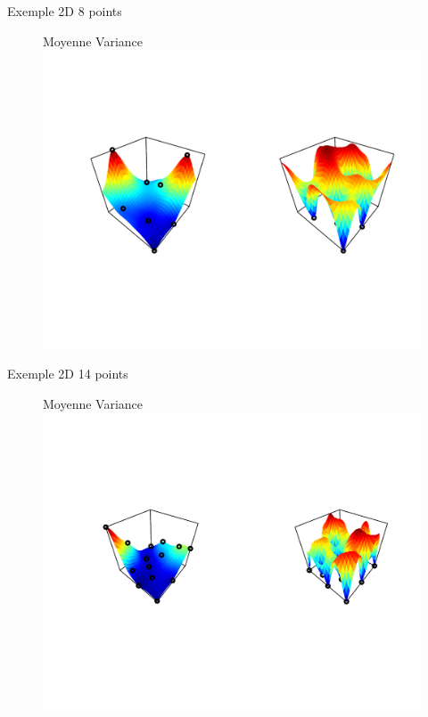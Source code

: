 \begin{frame}[noframenumbering]{Exemple 2D}
8 points
\begin{figure}
\hspace{5mm} Moyenne \hspace{50mm} Variance
	\includegraphics[trim=12mm 40mm 12mm 40mm,width=\textwidth, clip]{mse/maxMSE4.pdf}
\end{figure}
\end{frame}
\begin{frame}[noframenumbering]{Exemple 2D}
14 points
\begin{figure}
\hspace{5mm} Moyenne \hspace{50mm} Variance
	\includegraphics[trim=12mm 40mm 12mm 40mm,width=\textwidth, clip]{mse/maxMSE1414.pdf}
\end{figure}
\end{frame}
